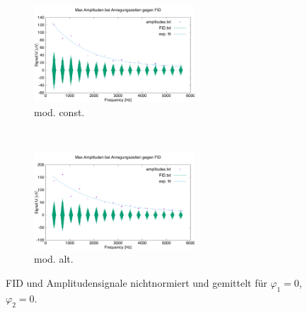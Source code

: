 \documentclass{article}
\begin{document}
        

        \begin{figure}[h]
            \centering
            \begin{subfigure}[b]{0.4\textwidth}
                \centering
                \includegraphics[width=6cm]{../Bilddateien/CPMG-0-0-constant-avg.png}
                \caption{mod. const.}
                \label{fig:CPMG-0-0-constant-avg}
            \end{subfigure}
            \
            \begin{subfigure}[b]{0.4\textwidth}
                \centering
                \includegraphics[width=6cm]{../Bilddateien/CPMG-0-0-alternating-avg.png}
                \caption{mod. alt.}
                \label{fig:CPMG-0-0-alternating-avg}
            \end{subfigure}
            \caption{FID und Amplitudensignale nichtnormiert und gemittelt für $\varphi_1 = 0$, $\varphi_2 = 0$.}
            \label{fig:CPMG-0-0-avg}
        \end{figure}
\end{document}
